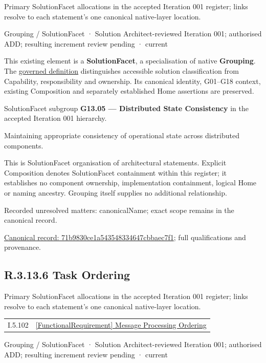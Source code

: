 Primary SolutionFacet allocations in the accepted Iteration 001 register; links resolve to each statement’s one canonical native-layer location.\par
\label{element:71b9830ce1a543548334647cbbaec7f1}
{\small Grouping / SolutionFacet · Solution Architect-reviewed Iteration 001; authorised ADD; resulting increment review pending · current}\par

This existing element is a \textbf{SolutionFacet}, a specialisation of native
\textbf{Grouping}. The \href{\detokenize{../../../../../../../governance/continuum-representation.md#solutionfacet-classification--1119-candidate}}{governed definition}
distinguishes accessible solution classification from Capability, responsibility
and ownership. Its canonical identity, G01–G18 context, existing Composition
and separately established Home assertions are preserved.



SolutionFacet subgroup \textbf{G13.05 — Distributed State Consistency} in the accepted Iteration 001 hierarchy.



Maintaining appropriate consistency of operational state across distributed components.



This is SolutionFacet organisation of architectural statements. Explicit Composition denotes SolutionFacet containment within this register; it establishes no component ownership, implementation containment, logical Home or naming ancestry. Grouping itself supplies no additional relationship.


{\small Recorded unresolved matters: canonicalName; exact scope remains in the canonical record.}\par
{\footnotesize \href{../../../../../../../continuum/grouping/71b9830ce1a543548334647cbbaec7f1.md}{Canonical record: 71b9830ce1a543548334647cbbaec7f1}; full qualifications and provenance.}\par
\subsection*{R.3.13.6 Task Ordering}
\label{navigation:R.3.13.6}

Primary SolutionFacet allocations in the accepted Iteration 001 register; links resolve to each statement’s one canonical native-layer location.\par
\begin{longtable}{p{.22\linewidth}p{.73\linewidth}}
I.5.102 & \hyperref[element:3c11adccd7194276b787416368c13858]{[FunctionalRequirement] Message Processing Ordering} \\
\end{longtable}
\label{element:0528b2ac76c548ae861ebcb1ef9cf3d9}
{\small Grouping / SolutionFacet · Solution Architect-reviewed Iteration 001; authorised ADD; resulting increment review pending · current}\par

